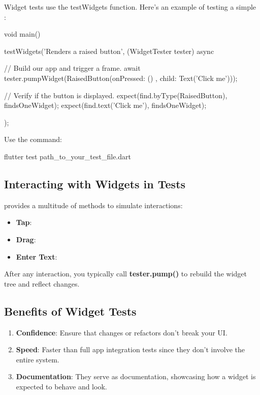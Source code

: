 Widget tests use the testWidgets function. Here's an example of testing a simple :

\begin{dartcode}
void main() {
  testWidgets('Renders a raised button', (WidgetTester tester) async {
    // Build our app and trigger a frame.
    await tester.pumpWidget(RaisedButton(onPressed: () {}, child: Text('Click me')));

    // Verify if the button is displayed.
    expect(find.byType(RaisedButton), findsOneWidget);
    expect(find.text('Click me'), findsOneWidget);
  });
}
\end{dartcode}

Use the command:
\begin{bashcode}
flutter test path_to_your_test_file.dart
\end{bashcode}

\subsection*{Interacting with Widgets in Tests}
 provides a multitude of methods to simulate interactions:

\begin{itemize}
 \item \textbf{Tap}: 
 \item \textbf{Drag}: 
 \item \textbf{Enter Text}: 
\end{itemize}
After any interaction, you typically call \textbf{tester.pump()} to rebuild the widget tree and reflect changes.

\subsection*{Benefits of Widget Tests}
\begin{enumerate}
 \item \textbf{Confidence}: Ensure that changes or refactors don't break your UI.
 \item \textbf{Speed}: Faster than full app integration tests since they don't involve the entire system.
 \item \textbf{Documentation}: They serve as documentation, showcasing how a widget is expected to behave and look.
\end{enumerate}

